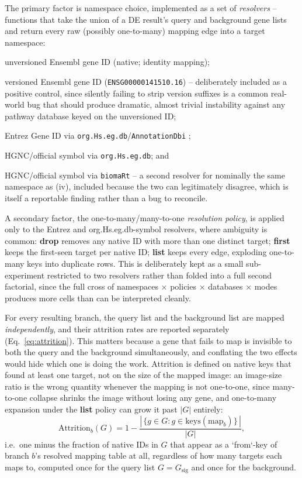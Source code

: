 \documentclass[webpdf,contemporary,large]{oup-authoring-template}
\theoremstyle{thmstyleone}%
\theoremstyle{thmstyletwo}%
\theoremstyle{thmstylethree}%
\begin{document}
The primary factor is namespace choice, implemented as a set of \emph{resolvers} -- functions that take the union of a DE result's query and background gene lists and return every raw (possibly one-to-many) mapping edge into a target namespace:

\begin{unlist}
\item unversioned Ensembl gene ID (native; identity mapping);
\item versioned Ensembl gene ID (\texttt{ENSG00000141510.16}) -- deliberately included as a positive control, since silently failing to strip version suffixes is a common real-world bug that should produce dramatic, almost trivial instability against any pathway database keyed on the unversioned ID;
\item Entrez Gene ID via \texttt{org.Hs.eg.db}/\texttt{AnnotationDbi} \citep{huber2015bioconductor};
\item HGNC/official symbol via \texttt{org.Hs.eg.db}; and
\item HGNC/official symbol via \texttt{biomaRt} \citep{durinck2009biomart} -- a second resolver for nominally the same namespace as (iv), included because the two can legitimately disagree, which is itself a reportable finding rather than a bug to reconcile.
\end{unlist}

A secondary factor, the one-to-many/many-to-one \emph{resolution policy}, is applied only to the Entrez and org.Hs.eg.db-symbol resolvers, where ambiguity is common: \textbf{drop} removes any native ID with more than one distinct target; \textbf{first} keeps the first-seen target per native ID; \textbf{list} keeps every edge, exploding one-to-many keys into duplicate rows. This is deliberately kept as a small sub-experiment restricted to two resolvers rather than folded into a full second factorial, since the full cross of namespaces $\times$ policies $\times$ databases $\times$ modes produces more cells than can be interpreted cleanly.

For every resulting branch, the query list and the background list are mapped \emph{independently}, and their attrition rates are reported separately (Eq.~\ref{eq:attrition}). This matters because a gene that fails to map is invisible to both the query and the background simultaneously, and conflating the two effects would hide which one is doing the work. Attrition is defined on native keys that found at least one target, not on the size of the mapped image: an image-size ratio is the wrong quantity whenever the mapping is not one-to-one, since many-to-one collapse shrinks the image without losing any gene, and one-to-many expansion under the \textbf{list} policy can grow it past $|G|$ entirely:
\begin{equation}
\mathrm{Attrition}_b(G) = 1 - \frac{|\,\{g \in G : g \in \mathrm{keys}(\mathrm{map}_b)\}\,|}{|G|},
\label{eq:attrition}
\end{equation}
i.e.\ one minus the fraction of native IDs in $G$ that appear as a `from`-key of branch $b$'s resolved mapping table at all, regardless of how many targets each maps to, computed once for the query list $G = G_{\mathrm{sig}}$ and once for the background.
\end{document}
